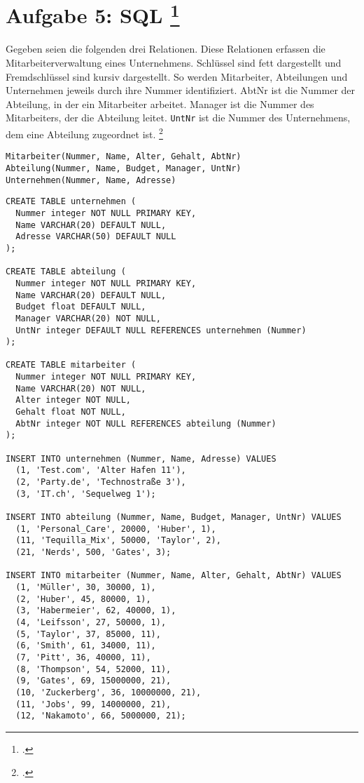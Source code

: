 \documentclass{bschlangaul-aufgabe}
\begin{document}

\section{Aufgabe 5: SQL
\footcite[Thema 1 Aufgabe 5]{66113:2003:03}}

Gegeben seien die folgenden drei Relationen. Diese Relationen erfassen
die Mitarbeiterverwaltung eines Unternehmens. Schlüssel sind fett
dargestellt und Fremdschlüssel sind kursiv dargestellt. So werden
Mitarbeiter, Abteilungen und Unternehmen jeweils durch ihre Nummer
identifiziert. AbtNr ist die Nummer der Abteilung, in der ein
Mitarbeiter arbeitet. Manager ist die Nummer des Mitarbeiters, der die
Abteilung leitet. \verb|UntNr| ist die Nummer des Unternehmens, dem eine
Abteilung zugeordnet ist.
\footcite[Aufgabe 2: SQL]{db:pu:2}

\begin{verbatim}
Mitarbeiter(Nummer, Name, Alter, Gehalt, AbtNr)
Abteilung(Nummer, Name, Budget, Manager, UntNr)
Unternehmen(Nummer, Name, Adresse)
\end{verbatim}

\begin{verbatim}
CREATE TABLE unternehmen (
  Nummer integer NOT NULL PRIMARY KEY,
  Name VARCHAR(20) DEFAULT NULL,
  Adresse VARCHAR(50) DEFAULT NULL
);

CREATE TABLE abteilung (
  Nummer integer NOT NULL PRIMARY KEY,
  Name VARCHAR(20) DEFAULT NULL,
  Budget float DEFAULT NULL,
  Manager VARCHAR(20) NOT NULL,
  UntNr integer DEFAULT NULL REFERENCES unternehmen (Nummer)
);

CREATE TABLE mitarbeiter (
  Nummer integer NOT NULL PRIMARY KEY,
  Name VARCHAR(20) NOT NULL,
  Alter integer NOT NULL,
  Gehalt float NOT NULL,
  AbtNr integer NOT NULL REFERENCES abteilung (Nummer)
);

INSERT INTO unternehmen (Nummer, Name, Adresse) VALUES
  (1, 'Test.com', 'Alter Hafen 11'),
  (2, 'Party.de', 'Technostraße 3'),
  (3, 'IT.ch', 'Sequelweg 1');

INSERT INTO abteilung (Nummer, Name, Budget, Manager, UntNr) VALUES
  (1, 'Personal_Care', 20000, 'Huber', 1),
  (11, 'Tequilla_Mix', 50000, 'Taylor', 2),
  (21, 'Nerds', 500, 'Gates', 3);

INSERT INTO mitarbeiter (Nummer, Name, Alter, Gehalt, AbtNr) VALUES
  (1, 'Müller', 30, 30000, 1),
  (2, 'Huber', 45, 80000, 1),
  (3, 'Habermeier', 62, 40000, 1),
  (4, 'Leifsson', 27, 50000, 1),
  (5, 'Taylor', 37, 85000, 11),
  (6, 'Smith', 61, 34000, 11),
  (7, 'Pitt', 36, 40000, 11),
  (8, 'Thompson', 54, 52000, 11),
  (9, 'Gates', 69, 15000000, 21),
  (10, 'Zuckerberg', 36, 10000000, 21),
  (11, 'Jobs', 99, 14000000, 21),
  (12, 'Nakamoto', 66, 5000000, 21);
\end{verbatim}
\end{document}
